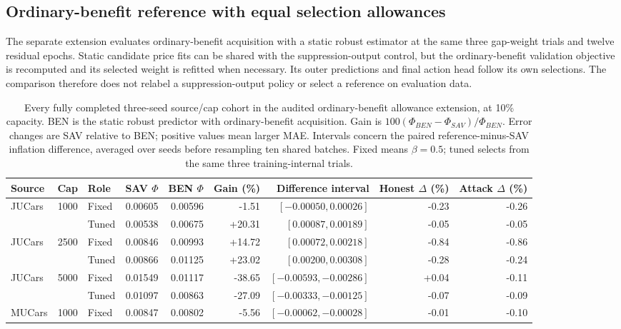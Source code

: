 \subsection{Ordinary-benefit reference with equal selection allowances}
The separate extension evaluates ordinary-benefit acquisition with a static
robust estimator at the same three gap-weight trials and twelve residual
epochs. Static candidate price fits can be shared with the suppression-output
control, but the ordinary-benefit validation objective is recomputed and its
selected weight is refitted when necessary. Its outer predictions and final
action head follow its own selections. The comparison therefore does not
relabel a suppression-output policy or select a reference on evaluation data.

\begin{table}[t]
\centering
\caption{Every fully completed three-seed source/cap cohort in the audited
ordinary-benefit allowance extension, at 10\% capacity. BEN is the static robust
predictor with ordinary-benefit acquisition. Gain is $100(\Phi_{BEN}-\Phi_{SAV})/
\Phi_{BEN}$. Error changes are SAV relative to BEN; positive values mean larger
MAE. Intervals concern the paired reference-minus-SAV inflation difference,
averaged over seeds before resampling ten shared batches. Fixed means
$\beta=0.5$; tuned selects from the same three training-internal trials.}
\label{tab:equal_benefit_reference}
\small
\begin{tabular}{lrlrrrrrr}
\toprule
Source & Cap & Role & SAV $\Phi$ & BEN $\Phi$ & Gain (\%) & Difference interval & Honest $\Delta$ (\%) & Attack $\Delta$ (\%)\\
\midrule
JUCars & 1000 & Fixed & 0.00605 & 0.00596 & -1.51 & $[-0.00050,0.00026]$ & -0.23 & -0.26\\
 &  & Tuned & 0.00538 & 0.00675 & +20.31 & $[0.00087,0.00189]$ & -0.05 & -0.05\\
\midrule
JUCars & 2500 & Fixed & 0.00846 & 0.00993 & +14.72 & $[0.00072,0.00218]$ & -0.84 & -0.86\\
 &  & Tuned & 0.00866 & 0.01125 & +23.02 & $[0.00200,0.00308]$ & -0.28 & -0.24\\
\midrule
JUCars & 5000 & Fixed & 0.01549 & 0.01117 & -38.65 & $[-0.00593,-0.00286]$ & +0.04 & -0.11\\
 &  & Tuned & 0.01097 & 0.00863 & -27.09 & $[-0.00333,-0.00125]$ & -0.07 & -0.09\\
\midrule
MUCars & 1000 & Fixed & 0.00847 & 0.00802 & -5.56 & $[-0.00062,-0.00028]$ & -0.01 & -0.10\\

\end{tabular}
\end{table}
